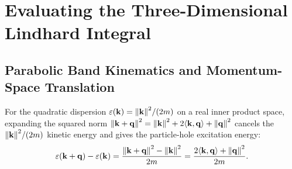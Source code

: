 \documentclass[11pt, a4paper]{article}
\numberwithin{equation}{section}
\begin{document}
\section{Evaluating the Three-Dimensional Lindhard Integral}

\subsection{Parabolic Band Kinematics and Momentum-Space Translation}

For the quadratic dispersion $\varepsilon(\mathbf{k}) = \norm{\mathbf{k}}^2 / (2m)$ on a real inner product space, expanding the squared norm $\norm{\mathbf{k} + \mathbf{q}}^2 = \norm{\mathbf{k}}^2 + 2 \langle \mathbf{k}, \mathbf{q} \rangle + \norm{\mathbf{q}}^2$ cancels the $\norm{\mathbf{k}}^2/(2m)$ kinetic energy and gives the particle-hole excitation energy:
\begin{equation}\label{eq:quadratic_sub}
  \varepsilon(\mathbf{k} + \mathbf{q}) - \varepsilon(\mathbf{k})
  = \frac{\norm{\mathbf{k} + \mathbf{q}}^2 - \norm{\mathbf{k}}^2}{2m}
  = \frac{2 \langle \mathbf{k}, \mathbf{q} \rangle + \norm{\mathbf{q}}^2}{2m}.
\end{equation}
\end{document}
